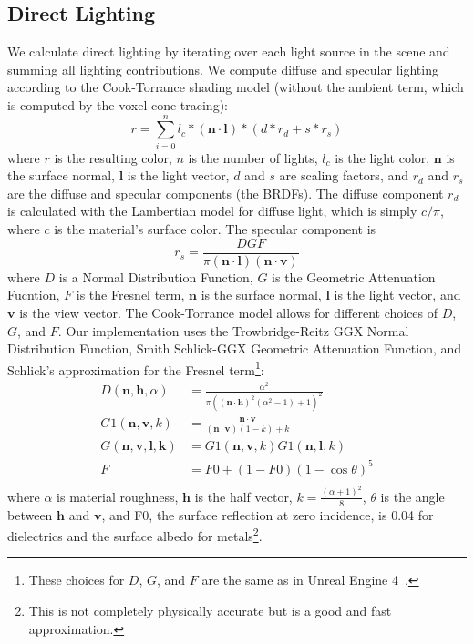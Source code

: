 \subsection{Direct Lighting}
We calculate direct lighting by iterating over each light source in the scene and summing all lighting contributions. We compute diffuse and specular lighting according to the Cook-Torrance shading model (without the ambient term, which is computed by the voxel cone tracing):
\[
    r = \sum_{i=0}^{n} l_c * (\bm{n} \cdot \bm{l}) * (d * r_d + s * r_s)
\]
where $r$ is the resulting color, $n$ is the number of lights, $l_c$ is the light color, $\bm{n}$ is the surface normal, $\bm{l}$ is the light vector, $d$ and $s$ are scaling factors, and $r_d$ and $r_s$ are the diffuse and specular components (the BRDFs). The diffuse component $r_d$ is calculated with the Lambertian model for diffuse light, which is simply $c / \pi$, where $c$ is the material's surface color. The specular component is
\[
    r_s = \frac{DGF}{\pi (\bm{n} \cdot \bm{l}) (\bm{n} \cdot \bm{v})}
\]
where $D$ is a Normal Distribution Function, $G$ is the Geometric Attenuation Fucntion, $F$ is the Fresnel term, $\bm{n}$ is the surface normal, $\bm{l}$ is the light vector, and $\bm{v}$ is the view vector. The Cook-Torrance model allows for different choices of $D$, $G$, and $F$. Our implementation uses the Trowbridge-Reitz GGX Normal Distribution Function, Smith Schlick-GGX Geometric Attenuation Function, and Schlick's approximation for the Fresnel term\footnote{These choices for $D$, $G$, and $F$ are the same as in Unreal Engine 4~\cite{karis2013real}.}:
\begin{align*}
    D(\bm{n}, \bm{h}, \alpha) &= \frac{\alpha^2}{\pi ((\bm{n} \cdot \bm{h})^2 (\alpha^2 - 1) + 1)^2} \\
    G1(\bm{n}, \bm{v}, k) &= \frac{\bm{n} \cdot \bm{v}}{(\bm{n} \cdot \bm{v}) (1 - k) + k} \\
    G(\bm{n}, \bm{v}, \bm{l}, \bm{k}) &= G1(\bm{n}, \bm{v}, k) G1(\bm{n}, \bm{l}, k) \\
    F &= F0 + (1 - F0) (1 - \cos \theta)^5 \\
\end{align*}
where $\alpha$ is material roughness, $\bm{h}$ is the half vector, $k = \frac{(\alpha + 1)^2}{8}$, $\theta$ is the angle between $\bm{h}$ and $\bm{v}$, and F0, the surface reflection at zero incidence, is 0.04 for dielectrics and the surface albedo for metals\footnote{This is not completely physically accurate but is a good and fast approximation.}.

